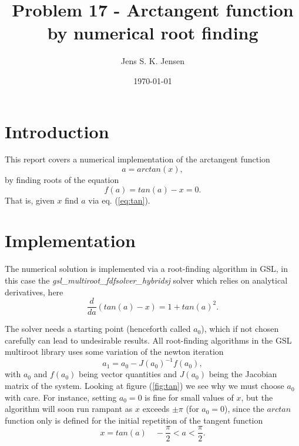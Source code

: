 \documentclass{article}
\begin{document}
\title{Problem 17 - Arctangent function by numerical root finding}
\author{Jens S. K. Jensen}
\date{\today}
\maketitle

\section{Introduction}
This report covers a numerical implementation of the arctangent function
\begin{equation}
	a = arctan(x),
	\label{eq:atan1}
\end{equation}
by finding roots of the equation
\begin{equation}
	f(a) = tan(a) - x = 0.
	\label{eq:tan}
\end{equation}
That is, given $x$ find $a$ via eq. (\ref{eq:tan}).

\section{Implementation}
The numerical solution is implemented via a root-finding algorithm in GSL, in this case the \textit{gsl\_multiroot\_fdfsolver\_hybridsj} solver which relies on analytical derivatives, here
\begin{equation}
	\frac{d}{da}(tan(a) - x) = 1+tan(a)^2.
\end{equation}

The solver needs a starting point (henceforth called $a_0$), which if not chosen carefully can lead to undesirable results. All root-finding algorithms in the GSL multiroot library uses some variation of the newton iteration
\begin{equation}
	a_1 = a_0 - J(a_0)^{-1}f(a_0),
\end{equation}
with $a_0$ and $f(a_0)$ being vector quantities and $J(a_0)$ being the Jacobian matrix of the system. Looking at figure (\ref{fig:tan}) we see why we must choose $a_0$ with care. For instance, setting $a_0 = 0$ is fine for small values of $x$, but the algorithm will soon run rampant as $x$ exceeds $\pm \pi$ (for $a_0=0$), since the $arctan$ function only is defined for the initial repetition of the tangent function
\begin{equation}
	x = tan(a) \quad -\frac{\pi}{2}<a<\frac{\pi}{2}.
	\label{eq:limits}
\end{equation}
\end{document}
